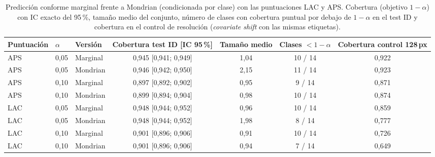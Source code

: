 \begin{table}[tbp]
\centering
\scriptsize
\setlength{\tabcolsep}{3pt}
\caption{Predicción conforme marginal frente a Mondrian (condicionada por clase) con las puntuaciones LAC y APS. Cobertura (objetivo $1-\alpha$) con IC exacto del 95\,\%, tamaño medio del conjunto, número de clases con cobertura puntual por debajo de $1-\alpha$ en el test ID y cobertura en el control de resolución (\emph{covariate shift} con las mismas etiquetas).}
\label{tab:mondrian-global}
\begin{tabular}{lllcccc}
\toprule
Puntuación & $\alpha$ & Versión & Cobertura test ID [IC 95\,\%] & Tamaño medio & Clases $<1-\alpha$ & Cobertura control 128\,px \\
\midrule
APS & 0{,}05 & Marginal & 0{,}945 [0{,}941; 0{,}949] & 1{,}04 & 10 / 14 & 0{,}922 \\
APS & 0{,}05 & Mondrian & 0{,}946 [0{,}942; 0{,}950] & 2{,}15 & 11 / 14 & 0{,}923 \\
\midrule
APS & 0{,}10 & Marginal & 0{,}897 [0{,}892; 0{,}902] & 0{,}95 & 9 / 14 & 0{,}871 \\
APS & 0{,}10 & Mondrian & 0{,}899 [0{,}894; 0{,}904] & 0{,}98 & 10 / 14 & 0{,}874 \\
\midrule
LAC & 0{,}05 & Marginal & 0{,}948 [0{,}944; 0{,}952] & 0{,}96 & 10 / 14 & 0{,}859 \\
LAC & 0{,}05 & Mondrian & 0{,}948 [0{,}944; 0{,}952] & 1{,}98 & 8 / 14 & 0{,}777 \\
\midrule
LAC & 0{,}10 & Marginal & 0{,}901 [0{,}896; 0{,}906] & 0{,}91 & 10 / 14 & 0{,}726 \\
LAC & 0{,}10 & Mondrian & 0{,}901 [0{,}896; 0{,}906] & 0{,}94 & 7 / 14 & 0{,}649 \\
\bottomrule
\end{tabular}
\end{table}
